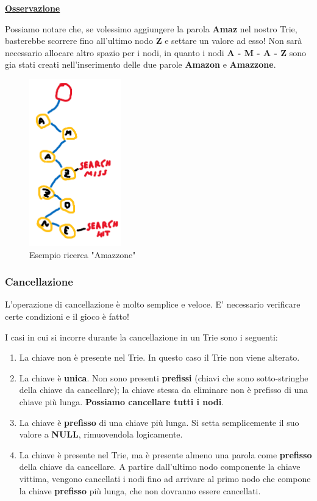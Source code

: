 \documentclass[a4paper, 12pt]{article}
\begin{document}
\textbf{\underline{Osservazione}}

Possiamo notare che, se volessimo aggiungere la parola \textbf{Amaz} nel nostro Trie, basterebbe scorrere fino all'ultimo nodo \textbf{Z} e settare un valore ad esso! Non sarà necessario allocare altro spazio per i nodi, in quanto i nodi \textbf{A - M - A - Z} sono gia stati creati nell'inserimento delle due parole \textbf{Amazon} e \textbf{Amazzone}. 

\begin{figure}[ht!]
    \centering
    \includegraphics[width=4cm]{Images/ricerca.png}
    \caption{Esempio ricerca "Amazzone"}
    \label{fig:searchexample}
\end{figure}

\subsubsection{Cancellazione}
L'operazione di cancellazione è molto semplice e veloce. E' necessario verificare certe condizioni e il gioco è fatto!

I casi in cui si incorre durante la cancellazione in un Trie sono i seguenti:

\begin{enumerate}
    \item La chiave non è presente nel Trie. In questo caso il Trie non viene alterato.
    
    \item La chiave è \textbf{unica}. Non sono presenti \textbf{prefissi} (chiavi che sono sotto-stringhe della chiave da cancellare); la chiave stessa da eliminare non è prefisso di una chiave più lunga. \textbf{Possiamo cancellare tutti i nodi}.
    
    \item La chiave è \textbf{prefisso} di una chiave più lunga. Si setta semplicemente il suo valore a \textbf{NULL}, rimuovendola logicamente.
    
    \item La chiave è presente nel Trie, ma è presente almeno una parola come \textbf{prefisso} della chiave da cancellare. A partire dall'ultimo nodo componente la chiave vittima, vengono cancellati i nodi fino ad arrivare al primo nodo che compone la chiave \textbf{prefisso} più lunga, che non dovranno essere cancellati.
\end{enumerate}
\end{document}
